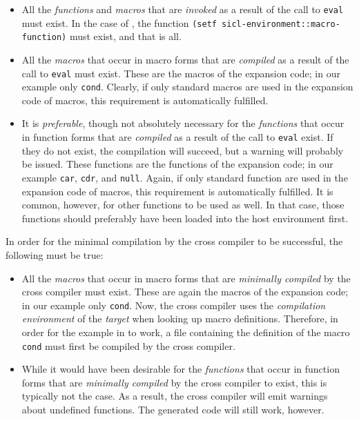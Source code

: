 \begin{itemize}
\item All the \emph{functions} and \emph{macros} that are
  \emph{invoked} as a result of the call to \texttt{eval} must exist.
  In the case of , the function
  \texttt{(setf sicl-environment::macro-function)} must exist, and that
    is all.
\item All the \emph{macros} that occur in macro forms that are
  \emph{compiled} as a result of the call to \texttt{eval} must
  exist.  These are the macros of the expansion code; in our example
  only \texttt{cond}.  Clearly, if only standard \commonlisp{} macros are
  used in the expansion code of macros, this requirement is
  automatically fulfilled.
\item It is \emph{preferable}, though not absolutely necessary for the
  \emph{functions} that occur in function forms that are
  \emph{compiled} as a result of the call to \texttt{eval} exist.  If
  they do not exist, the compilation will succeed, but a warning will
  probably be issued.  These functions are the functions of the
  expansion code; in our example \texttt{car}, \texttt{cdr}, and
  \texttt{null}.  Again, if only standard \commonlisp{} function are used in
  the expansion code of macros, this requirement is automatically
  fulfilled.  It is common, however, for other functions to be used as
  well.  In that case, those functions should preferably have been
  loaded into the host environment first. 
\end{itemize}

In order for the minimal compilation by the cross compiler to be
successful, the following must be true:

\begin{itemize}
\item All the \emph{macros} that occur in macro forms that are
  \emph{minimally compiled} by the cross compiler must exist.  These
  are again the macros of the expansion code; in our example only
  \texttt{cond}.  Now, the cross compiler uses the \emph{compilation
    environment} of the \emph{target} when looking up macro
  definitions.  Therefore, in order for the example in
   to work, a file containing the
  definition of the macro \texttt{cond} must first be compiled by the
  cross compiler. 
\item While it would have been desirable for the \emph{functions} that
  occur in function forms that are \emph{minimally compiled} by the
  cross compiler to exist, this is typically not the case.%
  As a
  result, the cross compiler will emit warnings about undefined
  functions.  The generated code will still work, however.
\end{itemize}

